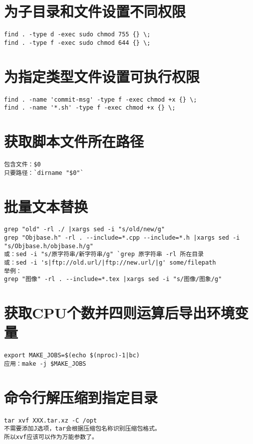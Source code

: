 \documentclass[a4paper,fontset=fandol,zihao=-4,linespread=1.2,oneside]{ctexbook}
\begin{document}
\section{为子目录和文件设置不同权限}
\begin{lstlisting}
find . -type d -exec sudo chmod 755 {} \;
find . -type f -exec sudo chmod 644 {} \;
\end{lstlisting}

\section{为指定类型文件设置可执行权限}
\begin{lstlisting}
find . -name 'commit-msg' -type f -exec chmod +x {} \;
find . -name '*.sh' -type f -exec chmod +x {} \;
\end{lstlisting}

\section{获取脚本文件所在路径}
\begin{lstlisting}
包含文件：$0
只要路径：`dirname "$0"`
\end{lstlisting}

\section{批量文本替换}
\begin{lstlisting}
grep "old" -rl ./ |xargs sed -i "s/old/new/g"
grep "Objbase.h" -rl . --include=*.cpp --include=*.h |xargs sed -i "s/Objbase.h/objbase.h/g"
或：sed -i "s/原字符串/新字符串/g" `grep 原字符串 -rl 所在目录
或：sed -i 's|ftp://old.url/|ftp://new.url/|g' some/filepath
举例：
grep "图像" -rl . --include=*.tex |xargs sed -i "s/图像/图象/g"
\end{lstlisting}

\section{获取CPU个数并四则运算后导出环境变量}
\begin{lstlisting}
export MAKE_JOBS=$(echo $(nproc)-1|bc)
应用：make -j $MAKE_JOBS
\end{lstlisting}

\section{命令行解压缩到指定目录}
\begin{lstlisting}
tar xvf XXX.tar.xz -C /opt
不需要添加J选项，tar会根据压缩包名称识别压缩包格式。
所以xvf应该可以作为万能参数了。
\end{lstlisting}
\end{document}
